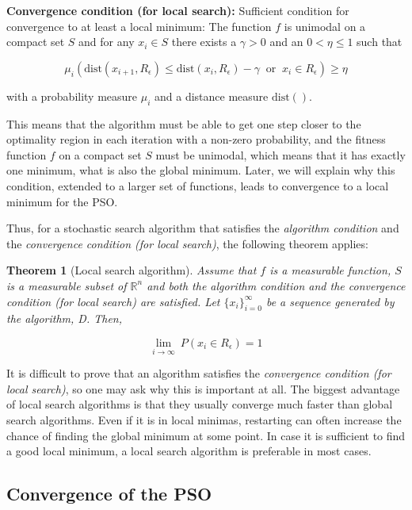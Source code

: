 \documentclass[
  oneside, a4paper, 12pt, openany]{book}
\newtheorem{theorem}{Theorem}[chapter]
\theoremstyle{definition}
\theoremstyle{definition}
\theoremstyle{definition}
\theoremstyle{definition}
\theoremstyle{remark}
\begin{document}
\textbf{Convergence condition (for local search):} Sufficient condition for convergence to at least a local minimum: The function \(f\) is unimodal on a compact set \(S\) and for any \(x_i\in S\) there exists a \(\gamma > 0\) and an \(0<\eta\leq1\) such that

\[
  \mu_i(\text{dist}(x_{i+1}, R_{\epsilon}) \leq \text{dist}(x_{i}, R_{\epsilon})-\gamma \ \text{  or  } \  x_i \in R_{\epsilon} ) \geq \eta
\]

with a probability measure \(\mu_i\) and a distance measure \(\text{dist}()\).

This means that the algorithm must be able to get one step closer to the optimality region in each iteration with a non-zero probability, and the fitness function \(f\) on a compact set \(S\) must be unimodal, which means that it has exactly one minimum, what is also the global minimum. Later, we will explain why this condition, extended to a larger set of functions, leads to convergence to a local minimum for the PSO.

Thus, for a stochastic search algorithm that satisfies the \emph{algorithm condition} and the \emph{convergence condition (for local search)}, the following theorem applies:

\begin{theorem}[Local search algorithm]
Assume that \(f\) is a measurable function, \(S\) is a measurable subset of \(\mathbb{R}^n\) and both the algorithm condition and the convergence condition (for local search) are satisfied. Let \(\{x_i\}^{\infty}_{i=0}\) be a sequence generated by the algorithm, D. Then,

\[
  \lim_{i\rightarrow \infty} \ P(x_i \in R_{\epsilon}) = 1
\]
\end{theorem}

It is difficult to prove that an algorithm satisfies the \emph{convergence condition (for local search)}, so one may ask why this is important at all. The biggest advantage of local search algorithms is that they usually converge much faster than global search algorithms. Even if it is in local minimas, restarting can often increase the chance of finding the global minimum at some point. In case it is sufficient to find a good local minimum, a local search algorithm is preferable in most cases.

\hypertarget{convergence-of-the-pso}{%
\subsection{Convergence of the PSO}\label{convergence-of-the-pso}}
\end{document}

